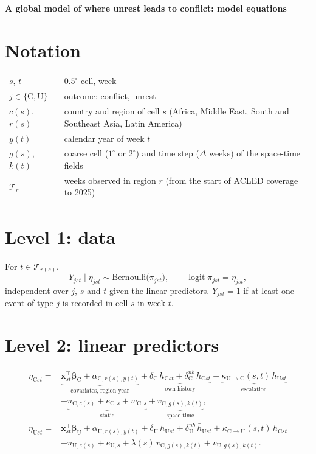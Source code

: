 \documentclass[10pt]{article}
\newcommand{\logit}{\operatorname{logit}}
\newcommand{\C}{\mathrm{C}}
\newcommand{\U}{\mathrm{U}}
\begin{document}
\begin{center}\textbf{A global model of where unrest leads to conflict: model equations}\end{center}

\section*{Notation}
\begin{tabular}{@{}ll@{}}
$s$, $t$ & $0.5^\circ$ cell, week \\
$j \in \{\C, \U\}$ & outcome: conflict, unrest \\
$c(s)$, $r(s)$ & country and region of cell $s$ (Africa, Middle East, South and Southeast Asia, Latin America) \\
$y(t)$ & calendar year of week $t$ \\
$g(s)$, $k(t)$ & coarse cell ($1^\circ$ or $2^\circ$) and time step ($\Delta$ weeks) of the space-time fields \\
$\mathcal{T}_r$ & weeks observed in region $r$ (from the start of ACLED coverage to 2025)
\end{tabular}

\section*{Level 1: data}
For $t \in \mathcal{T}_{r(s)}$,
\[
Y_{jst} \mid \eta_{jst} \sim \mathrm{Bernoulli}\bigl(\pi_{jst}\bigr), \qquad
\logit \pi_{jst} = \eta_{jst},
\]
independent over $j$, $s$ and $t$ given the linear predictors. $Y_{jst} = 1$ if at least one
event of type $j$ is recorded in cell $s$ in week $t$.

\section*{Level 2: linear predictors}
\begin{align*}
\eta_{\C st} ={}& \underbrace{\bm x_{st}^\top \bm\beta_{\C} + \alpha_{\C,r(s),y(t)}}_{\text{covariates, region-year}}
+ \underbrace{\delta_{\C}\, h_{\C st} + \delta^{nb}_{\C}\, \bar h_{\C st}}_{\text{own history}}
+ \underbrace{\kappa_{\U\to\C}(s,t)\, h_{\U st}}_{\text{escalation}}\\
&+ \underbrace{u_{\C,c(s)} + e_{\C,s} + w_{\C,s}}_{\text{static}}
+ \underbrace{v_{\C,g(s),k(t)}}_{\text{space-time}},\\[4pt]
\eta_{\U st} ={}& \bm x_{st}^\top \bm\beta_{\U} + \alpha_{\U,r(s),y(t)}
+ \delta_{\U}\, h_{\U st} + \delta^{nb}_{\U}\, \bar h_{\U st}
+ \kappa_{\C\to\U}(s,t)\, h_{\C st}\\
&+ u_{\U,c(s)} + e_{\U,s}
+ \lambda(s)\, v_{\C,g(s),k(t)} + v_{\U,g(s),k(t)}.
\end{align*}
\end{document}
